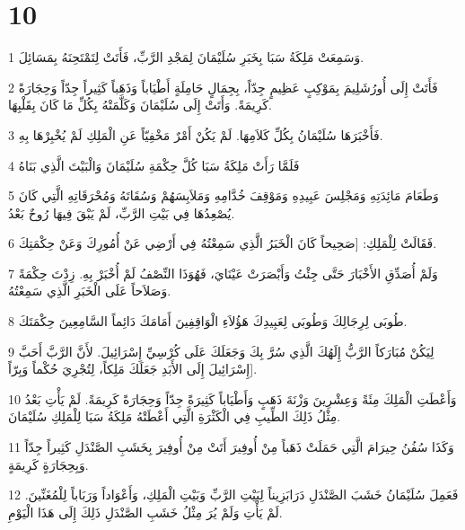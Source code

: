 \chapter{10}

\par 1 وَسَمِعَتْ مَلِكَةُ سَبَا بِخَبَرِ سُلَيْمَانَ لِمَجْدِ الرَّبِّ، فَأَتَتْ لِتَمْتَحِنَهُ بِمَسَائِلَ.
\par 2 فَأَتَتْ إِلَى أُورُشَلِيمَ بِمَوْكِبٍ عَظِيمٍ جِدّاً، بِجِمَالٍ حَامِلَةٍ أَطْيَاباً وَذَهَباً كَثِيراً جِدّاً وَحِجَارَةً كَرِيمَةً. وَأَتَتْ إِلَى سُلَيْمَانَ وَكَلَّمَتْهُ بِكُلِّ مَا كَانَ بِقَلْبِهَا.
\par 3 فَأَخْبَرَهَا سُلَيْمَانُ بِكُلِّ كَلاَمِهَا. لَمْ يَكُنْ أَمْرٌ مَخْفِيّاً عَنِ الْمَلِكِ لَمْ يُخْبِرْهَا بِهِ.
\par 4 فَلَمَّا رَأَتْ مَلِكَةُ سَبَا كُلَّ حِكْمَةِ سُلَيْمَانَ وَالْبَيْتَ الَّذِي بَنَاهُ
\par 5 وَطَعَامَ مَائِدَتِهِ وَمَجْلِسَ عَبِيدِهِ وَمَوْقِفَ خُدَّامِهِ وَمَلاَبِسَهُمْ وَسُقَاتَهُ وَمُحْرَقَاتِهِ الَّتِي كَانَ يُصْعِدُهَا فِي بَيْتِ الرَّبِّ، لَمْ يَبْقَ فِيهَا رُوحٌ بَعْدُ.
\par 6 فَقَالَتْ لِلْمَلِكِ: [صَحِيحاً كَانَ الْخَبَرُ الَّذِي سَمِعْتُهُ فِي أَرْضِي عَنْ أُمُورِكَ وَعَنْ حِكْمَتِكَ.
\par 7 وَلَمْ أُصَدِّقِ الأَخْبَارَ حَتَّى جِئْتُ وَأَبْصَرَتْ عَيْنَايَ، فَهُوَذَا النِّصْفُ لَمْ أُخْبَرْ بِهِ. زِدْتَ حِكْمَةً وَصَلاَحاً عَلَى الْخَبَرِ الَّذِي سَمِعْتُهُ.
\par 8 طُوبَى لِرِجَالِكَ وَطُوبَى لِعَبِيدِكَ هَؤُلاَءِ الْوَاقِفِينَ أَمَامَكَ دَائِماً السَّامِعِينَ حِكْمَتَكَ.
\par 9 لِيَكُنْ مُبَارَكاً الرَّبُّ إِلَهُكَ الَّذِي سُرَّ بِكَ وَجَعَلَكَ عَلَى كُرْسِيِّ إِسْرَائِيلَ. لأَنَّ الرَّبَّ أَحَبَّ إِسْرَائِيلَ إِلَى الأَبَدِ جَعَلَكَ مَلِكاً، لِتُجْرِيَ حُكْماً وَبِرّاً].
\par 10 وَأَعْطَتِ الْمَلِكَ مِئَةً وَعِشْرِينَ وَزْنَةَ ذَهَبٍ وَأَطْيَاباً كَثِيرَةً جِدّاً وَحِجَارَةً كَرِيمَةً. لَمْ يَأْتِ بَعْدُ مِثْلُ ذَلِكَ الطِّيبِ فِي الْكَثْرَةِ الَّتِي أَعْطَتْهُ مَلِكَةُ سَبَا لِلْمَلِكِ سُلَيْمَانَ.
\par 11 وَكَذَا سُفُنُ حِيرَامَ الَّتِي حَمَلَتْ ذَهَباً مِنْ أُوفِيرَ أَتَتْ مِنْ أُوفِيرَ بِخَشَبِ الصَّنْدَلِ كَثِيراً جِدّاً وَبِحِجَارَةٍ كَرِيمَةٍ.
\par 12 فَعَمِلَ سُلَيْمَانُ خَشَبَ الصَّنْدَلِ دَرَابَزِيناً لِبَيْتِ الرَّبِّ وَبَيْتِ الْمَلِكِ، وَأَعْوَاداً وَرَبَاباً لِلْمُغَنِّينَ. لَمْ يَأْتِ وَلَمْ يُرَ مِثْلُ خَشَبِ الصَّنْدَلِ ذَلِكَ إِلَى هَذَا الْيَوْمِ.
